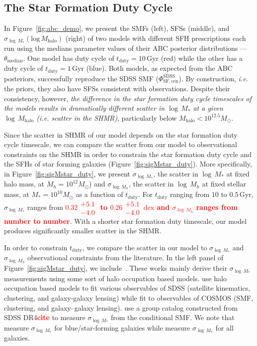 \documentclass[12pt, letterpaper, preprint]{aastex}
\newcommand{\todo}[1]{{\bf \textcolor{red}{#1}}}
\begin{document}
\subsection{The Star Formation Duty Cycle}
In Figure~\ref{fig:abc_demo}, we present the SMFs (left), SFSs (middle), and 
$\sigma_{\log\,M_*}(\mathrm{log}\,M_\mathrm{halo})$ (right) of two models 
with different SFH prescriptions each run using the medians parameter values 
of their ABC posterior distributions --- $\theta_\mathrm{median}$. One model 
has duty cycle of $t_\mathrm{duty} = 10\,\mathrm{Gyr}$ (red) while the other 
has a duty cycle of $t_\mathrm{duty} = 1\,\mathrm{Gyr}$ (blue). Both models, 
as expected from the ABC posteriors, successfully reproduce the SDSS SMF 
($\Phi^\mathrm{SDSS}_\mathrm{SF,cen}$). By construction, \emph{i.e.} the priors, 
they also have SFSs consistent with observations. Despite their consistency, 
however, \emph{the difference in the star formation duty cycle timescales of 
the models results in dramatically different scatter in $\log\,M_*$ at a given 
$\log\,M_\mathrm{halo}$ (\emph{i.e.} scatter in the SHMR)}, particularly below 
$M_\mathrm{halo} < 10^{12.5}M_\odot$. 

Since the scatter in SHMR of our model depends on the star formation duty cycle
timescale, we can compare the scatter from our model to observational constraints
on the SHMR in order to constrain the star formation duty cycle and the SFHs of star 
forming galaxies (Figure~\ref{fig:sigMstar_duty}). More specifically, in 
Figure~\ref{fig:sigMstar_duty}, we present $\sigma_{\log\,M_*}$, the scatter in 
$\log\,M_*$ at fixed halo mass, at $M_h = 10^{12} M_\odot$) and $\sigma_{\log\,M_h}$, 
the scatter in $\log\,M_h$ at fixed stellar mass, at $M_* = 10^{10} M_\odot$  
as a function of $t_\mathrm{duty}$. For $t_\mathrm{duty}$ ranging from $10$ to 
$0.5\,\mathrm{Gyr}$, $\sigma_{\log\,M_*}$ ranges from \todo{$0.32\substack{+5.1\\ -4.0}$ to 
$0.26\substack{+5.1\\ -4.0}\,\mathrm{dex}$ and $\sigma_{\log\,M_h}$ ranges from 
number to number}. With a shorter star formation duty timescale, our model 
produces significantly smaller scatter in the SHMR. 

In order to constrain $t_\mathrm{duty}$, we compare the scatter in our model to 
$\sigma_{\log\,M_*}$ and $\sigma_{\log\,M_h}$ observational constraints from the 
literature. In the left panel of Figure~\ref{fig:sigMstar_duty}, 
we include~\cite{yang2009, more2011, leauthaud2012, tinker2013, zu2015}. 
These works mainly derive their $\sigma_{\log\,M_*}$ measurements using some sort of 
halo occupation based models. \cite{more2011, zu2015} use halo occupation 
based models to fit various observables of SDSS (satellite kinematics, clustering, 
and galaxy-galaxy lensing) while \cite{leauthaud2012, tinker2013} fit to 
observables of COSMOS (SMF, clustering, and galaxy–galaxy lensing). \cite{yang2009} 
use a group catalog constructed from SDSS DR4\todo{cite} to measure $\sigma_{\log\,M_*}$ 
from the conditional SMF. We note that \cite{yang2009, more2011, tinker2013} 
measure $\sigma_{\log\,M_*}$ for blue/star-forming galaxies while 
\cite{leauthaud2012, zu2015} measure $\sigma_{\log\,M_*}$ for all galaxies. 
\end{document}

